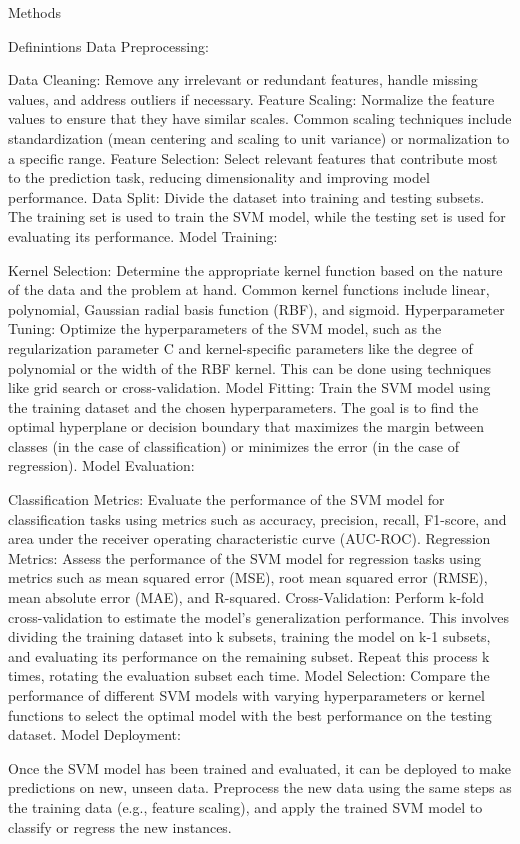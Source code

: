 \documentclass[
  ignorenonframetext,
]{beamer}
\begin{document}
\begin{frame}{Methods}
\begin{block}{Definintions}
Data Preprocessing:

Data Cleaning: Remove any irrelevant or redundant features, handle
missing values, and address outliers if necessary. Feature Scaling:
Normalize the feature values to ensure that they have similar scales.
Common scaling techniques include standardization (mean centering and
scaling to unit variance) or normalization to a specific range. Feature
Selection: Select relevant features that contribute most to the
prediction task, reducing dimensionality and improving model
performance. Data Split: Divide the dataset into training and testing
subsets. The training set is used to train the SVM model, while the
testing set is used for evaluating its performance. Model Training:

Kernel Selection: Determine the appropriate kernel function based on the
nature of the data and the problem at hand. Common kernel functions
include linear, polynomial, Gaussian radial basis function (RBF), and
sigmoid. Hyperparameter Tuning: Optimize the hyperparameters of the SVM
model, such as the regularization parameter C and kernel-specific
parameters like the degree of polynomial or the width of the RBF kernel.
This can be done using techniques like grid search or cross-validation.
Model Fitting: Train the SVM model using the training dataset and the
chosen hyperparameters. The goal is to find the optimal hyperplane or
decision boundary that maximizes the margin between classes (in the case
of classification) or minimizes the error (in the case of regression).
Model Evaluation:

Classification Metrics: Evaluate the performance of the SVM model for
classification tasks using metrics such as accuracy, precision, recall,
F1-score, and area under the receiver operating characteristic curve
(AUC-ROC). Regression Metrics: Assess the performance of the SVM model
for regression tasks using metrics such as mean squared error (MSE),
root mean squared error (RMSE), mean absolute error (MAE), and
R-squared. Cross-Validation: Perform k-fold cross-validation to estimate
the model's generalization performance. This involves dividing the
training dataset into k subsets, training the model on k-1 subsets, and
evaluating its performance on the remaining subset. Repeat this process
k times, rotating the evaluation subset each time. Model Selection:
Compare the performance of different SVM models with varying
hyperparameters or kernel functions to select the optimal model with the
best performance on the testing dataset. Model Deployment:

Once the SVM model has been trained and evaluated, it can be deployed to
make predictions on new, unseen data. Preprocess the new data using the
same steps as the training data (e.g., feature scaling), and apply the
trained SVM model to classify or regress the new instances.
\end{block}
\end{frame}
\end{document}
